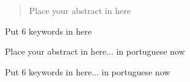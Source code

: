 \begin{abstract}
Place your abstract in here
\end{abstract}

\begin{keywords}
Put 6 keywords in here
\end{keywords}
\clearpage
\thispagestyle{empty}
\cleardoublepage

\begin{resumo}
Place your abstract in here... in portuguese now
\end{resumo}

\begin{palavraschave}
Put 6 keywords in here... in portuguese now
\end{palavraschave}

\clearpage
\thispagestyle{empty}
\cleardoublepage

\dominitoc
\dominilof
\dominilot
 
